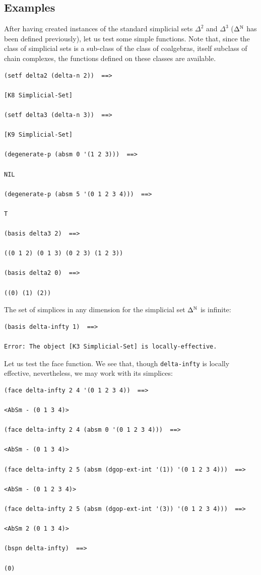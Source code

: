 \subsection* {Examples}
After having created instances of the standard simplicial sets $\Delta^2$ and $\Delta^3$ 
($\Delta^{{\Bbb N}}$ has been defined previously), let us test some simple functions. 
Note that, since the class of simplicial sets is a sub-class of the class of coalgebras, 
itself subclass of chain complexes, 
the functions defined on these classes are available.
{\footnotesize\begin{verbatim}
(setf delta2 (delta-n 2))  ==>

[K8 Simplicial-Set]

(setf delta3 (delta-n 3))  ==>

[K9 Simplicial-Set]

(degenerate-p (absm 0 '(1 2 3)))  ==>

NIL

(degenerate-p (absm 5 '(0 1 2 3 4)))  ==>

T

(basis delta3 2)  ==>

((0 1 2) (0 1 3) (0 2 3) (1 2 3))

(basis delta2 0)  ==>

((0) (1) (2))
\end{verbatim}}
The set of simplices in any dimension for the simplicial set $\Delta^{\Bbb N}$ is infinite:
{\footnotesize\begin{verbatim}
(basis delta-infty 1)  ==>

Error: The object [K3 Simplicial-Set] is locally-effective.
\end{verbatim}}
Let us test the face function. We see that, though {\tt delta-infty} is locally effective,
nevertheless, we may work with its simplices:
{\footnotesize\begin{verbatim}
(face delta-infty 2 4 '(0 1 2 3 4))  ==>

<AbSm - (0 1 3 4)>

(face delta-infty 2 4 (absm 0 '(0 1 2 3 4)))  ==>

<AbSm - (0 1 3 4)>

(face delta-infty 2 5 (absm (dgop-ext-int '(1)) '(0 1 2 3 4)))  ==>

<AbSm - (0 1 2 3 4)>

(face delta-infty 2 5 (absm (dgop-ext-int '(3)) '(0 1 2 3 4)))  ==>

<AbSm 2 (0 1 3 4)>

(bspn delta-infty)  ==>

(0)
\end{verbatim}}
